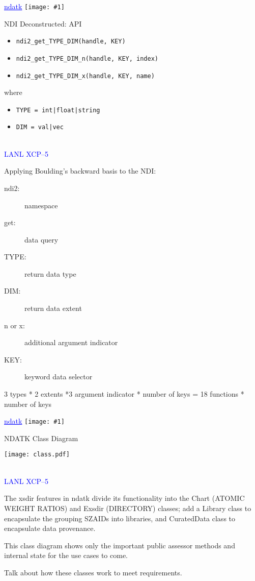 \documentclass[clock]{slides}
\newenvironment{xslide}[1][logo.jpg]{\begin{slide} \tiny
\textcolor{blue}{\underline{ndatk}} \hfill
\texttt{[image: \#1]}
\normalsize}{\vfill\tiny
\textcolor{blue}{\hrulefill \\LANL XCP--5}
\end{slide}}
\begin{document}
\begin{xslide}
\begin{center}\Large
NDI Deconstructed: API
\end{center}
\begin{itemize}
\item \verb+ndi2_get_TYPE_DIM(handle, KEY)+
\item \verb+ndi2_get_TYPE_DIM_n(handle, KEY, index)+
\item \verb+ndi2_get_TYPE_DIM_x(handle, KEY, name)+
\end{itemize}
where
\begin{itemize}
\item \verb+TYPE = int|float|string+
\item \verb+DIM = val|vec+
\end{itemize}
\end{xslide}

\begin{note}\small
Applying Boulding's backward basis to the NDI:
\begin{description}
\item[ndi2: ] namespace
\item[get: ] data query
\item[TYPE: ] return data type  
\item[DIM: ] return data extent
\item[n or x: ] additional argument indicator
\item[KEY: ] keyword data selector
\end{description}

3 types * 2 extents *3 argument indicator * number of keys =
18 functions * number of keys
\end{note}
 
\begin{xslide}
\begin{center}\Large
NDATK Class Diagram
\end{center}
\begin{center}
\texttt{[image: class.pdf]}
\end{center}
\end{xslide}

\begin{note}\small
The xsdir features in ndatk divide its functionality into the Chart
(ATOMIC WEIGHT RATIOS) and Exsdir (DIRECTORY) classes; add a Library
class to encapsulate the grouping SZAIDs into libraries, and
CuratedData class to encapsulate data provenance.

This class diagram shows only the important public assessor methods
and internal state for the use cases to come.

Talk about how these classes work to meet requirements.
\end{note}
\end{document}
